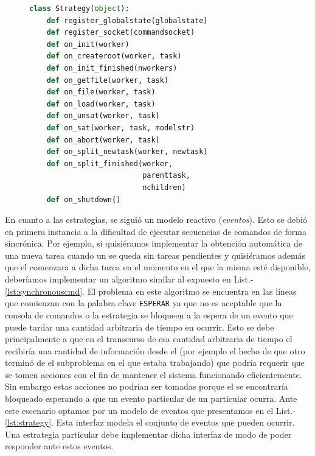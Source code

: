 \newcommand{\lst}{List.-}

\begin{figure}
\begin{footnotesize}
\begin{lstlisting}[language=Python,caption=Interfaz Strategy,label=lst:strategy]
class Strategy(object):
	def register_globalstate(globalstate)
	def register_socket(commandsocket)
	def on_init(worker)
	def on_createroot(worker, task)
	def on_init_finished(nworkers)
	def on_getfile(worker, task)
	def on_file(worker, task)
	def on_load(worker, task)
	def on_unsat(worker, task)
	def on_sat(worker, task, modelstr)
	def on_abort(worker, task)
	def on_split_newtask(worker, newtask)
	def on_split_finished(worker, 
	                      parenttask, 
	                      nchildren)
	def on_shutdown()
\end{lstlisting}
\end{footnotesize}
\end{figure}

En cuanto a las estrategias, se siguió un modelo reactivo (\emph{eventos}).
Esto se debió en primera instancia a la dificultad de ejecutar secuencias de
comandos de forma sincrónica. Por ejemplo, si quisiéramos implementar la
obtención automática de una nueva tarea cuando un \w se queda sin tareas
pendientes y quisiéramos además que el \w comenzara a \solvear dicha tarea en
el momento en el que la misma esté disponible, deberíamos implementar un
algoritmo similar al expuesto en \lst\ref{lst:synchronouscmd}. El problema en
este algoritmo se encuentra en las líneas que comienzan con la palabra clave
\texttt{ESPERAR} ya que no es aceptable que la consola de comandos o la
estrategia se bloqueen a la espera de un evento que puede tardar una cantidad
arbitraria de tiempo en ocurrir. Esto se debe principalmente a que en el
transcurso de esa cantidad arbitraria de tiempo el \fend recibiría una
cantidad de información desde el \bend (por ejemplo el hecho de que otro \w
terminó de \solvear el subproblema en el que estaba trabajando) que podría
requerir que se tomen acciones con el fin de mantener el sistema funcionando
eficientemente. Sin embargo estas acciones no podrían ser tomadas porque el
\fend se encontraría bloqueado esperando a que un evento particular de un \w
particular ocurra. Ante este escenario optamos por un modelo de eventos que
presentamos en el \lst\ref{lst:strategy}. Esta interfaz modela el conjunto de
eventos que pueden ocurrir. Una estrategia particular debe implementar dicha
interfaz de modo de poder responder ante estos eventos.

